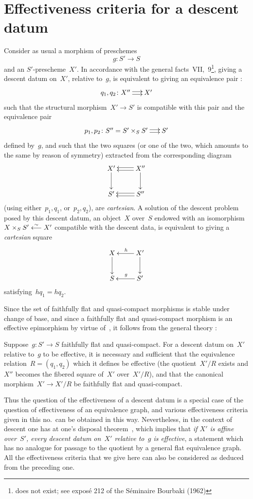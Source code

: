 \section{Effectiveness criteria for a descent datum}
\label{VIII.7}

Consider as usual a morphism of preschemes
$$
g\colon S'\to S
$$
and an $S'$-prescheme~$X'$. In accordance with the
general facts~VII,~9\footnote{does not exist; see expos\'e 212 of the
S\'eminaire Bourbaki (1962)},
giving a descent datum on~$X'$, relative
to~$g$, is equivalent to giving an equivalence
pair \cite{VIII.3}:
$$
\xymatrix@C=.5cm{ q_{1},q_{2}\colon X''\ar@<2pt>[r]\ar@<-2pt>[r] & X'}
$$
such that the structural morphism~$X'\to S'$ is compatible with this
pair and the equivalence pair
$$
\xymatrix@C=.5cm{p_{1},p_{2}\colon
S''=S'\times_{S}S'\ar@<2pt>[r]\ar@<-2pt>[r] & S'}
$$
defined by~$g$, and such that the two squares (or one of the two,
which amounts to the same by reason of symmetry) extracted from the
corresponding diagram
$$
\xymatrix{X'\ar[d] & X''\ar@<2pt>[l]\ar@<-2pt>[l]\ar[d]\\ S' &
S''\ar@<2pt>[l]\ar@<-2pt>[l]}
$$
(using either~$p_{1},q_{1}$, or~$p_{2},q_{2}$), are
\emph{cartesian}. A solution of the descent problem
posed by this descent datum, \ie an object~$X$ over~$S$
endowed with an isomorphism~$X\times_{S}S'\overset{\sim}{\longleftarrow} X'$ compatible with the
descent data, is equivalent to giving a
\emph{cartesian} square
$$
\xymatrix{X\ar[d] & X'\ar[l]_{h}\ar[d]\\ S & S'\ar[l]_{g}}
$$
satisfying~$hq_{1}=hq_{2}$.

Since
the set of faithfully flat and quasi-compact morphisms is
stable under change of base, and since a faithfully flat
and quasi-compact morphism is an effective epimorphism by virtue
of~, it follows from the general theory
\cite{VIII.D}:

\begin{proposition}
\label{VIII.7.1}
Suppose~$g\colon S'\to S$ faithfully flat and quasi-compact. For
a descent datum on~$X'$ relative to~$g$ to be
effective, it is necessary and sufficient that the equivalence
relation~$R=(q_{1},q_{2})$ which it defines be effective
(\ie the quotient~$X'/R$ exists and $X''$ becomes the fibered
square of~$X'$ over~$X'/R$), and that the canonical morphism~$X'\to
X'/R$ be faithfully flat and quasi-compact.
\end{proposition}

Thus the question of the effectiveness of a descent datum
is a special case of the question of effectiveness of an equivalence
graph, and various effectiveness criteria given
in this no.\ can be obtained in this way. Nevertheless, in the context
of descent one has at one's disposal
theorem~, which implies that \emph{if $X'$ is
affine over~$S'$, every descent datum on~$X'$ relative
to~$g$ is effective}, a statement which has no analogue for
passage to the quotient by a general flat equivalence
graph. All the effectiveness criteria that we
give here can also be considered as
deduced from the preceding one.

